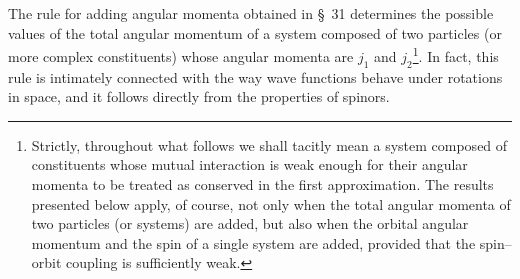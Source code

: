 The rule for adding angular momenta obtained in \S~31 determines the possible values of the total angular momentum of a system composed of two particles (or more complex constituents) whose angular momenta are $j_1$ and $j_2$\footnote{Strictly, throughout what follows we shall tacitly mean a system composed of constituents whose mutual interaction is weak enough for their angular momenta to be treated as conserved in the first approximation. The results presented below apply, of course, not only when the total angular momenta of two particles (or systems) are added, but also when the orbital angular momentum and the spin of a single system are added, provided that the spin--orbit coupling is sufficiently weak.}. In fact, this rule is intimately connected with the way wave functions behave under rotations in space, and it follows directly from the properties of spinors.
